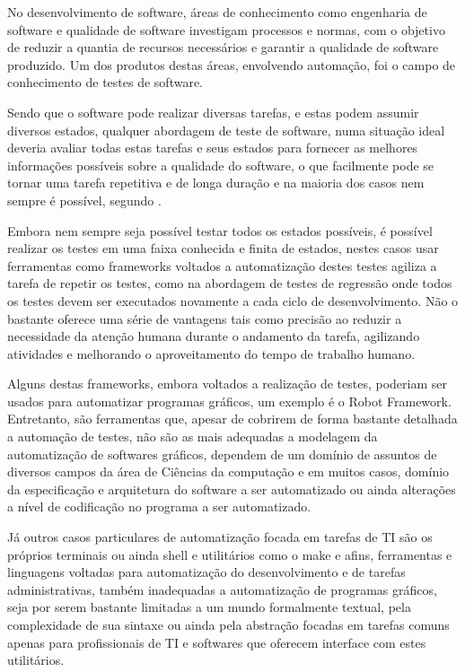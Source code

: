 \documentclass[12pt]{article}
\begin{document}
	No desenvolvimento de software, áreas de conhecimento como engenharia de software e qualidade de software
investigam processos e normas, com o objetivo de reduzir a quantia de recursos necessários e garantir a qualidade de
software produzido. Um dos produtos destas áreas, envolvendo automação, foi o campo de conhecimento de testes de software.

Sendo que o software pode realizar diversas tarefas, e estas podem assumir diversos estados, qualquer abordagem
de teste de software, numa situação ideal deveria avaliar todas estas tarefas e seus estados para fornecer as melhores
informações possíveis sobre a qualidade do software, o que facilmente pode se tornar uma tarefa repetitiva e de longa
duração e na maioria dos casos nem sempre é possível, segundo \cite[pag. 10]{myers2011art}.

Embora nem sempre seja possível testar todos os estados possíveis, é possível realizar os testes em uma faixa
conhecida e finita de estados, nestes casos usar ferramentas como frameworks voltados a automatização destes testes
agiliza a tarefa de repetir os testes, como na abordagem de testes de regressão onde todos os testes devem ser
executados novamente a cada ciclo de desenvolvimento. Não o bastante oferece uma série de vantagens tais como precisão ao reduzir a necessidade da atenção humana durante o andamento da tarefa, agilizando atividades e melhorando o aproveitamento do tempo de trabalho humano.

Alguns destas frameworks, embora voltados a realização de testes, poderiam ser usados para automatizar programas gráficos, um exemplo é o Robot Framework. Entretanto, são ferramentas que, apesar de cobrirem de forma bastante detalhada a automação de testes, não são as mais adequadas a modelagem da automatização de softwares gráficos, dependem de um domínio de assuntos de diversos campos da área de Ciências da computação e em muitos casos, domínio da especificação e arquitetura do software a ser automatizado ou ainda alterações a nível de codificação no programa a ser automatizado.

Já outros casos particulares de automatização focada em tarefas de TI são os próprios terminais ou ainda shell e utilitários como o make e afins, ferramentas e linguagens voltadas para automatização do desenvolvimento e de tarefas administrativas, também inadequadas a automatização de programas gráficos, seja por serem bastante limitadas a um mundo formalmente textual, pela complexidade de sua sintaxe ou ainda pela abstração focadas em tarefas comuns apenas para profissionais de TI e softwares que oferecem interface com estes utilitários.
\end{document}
